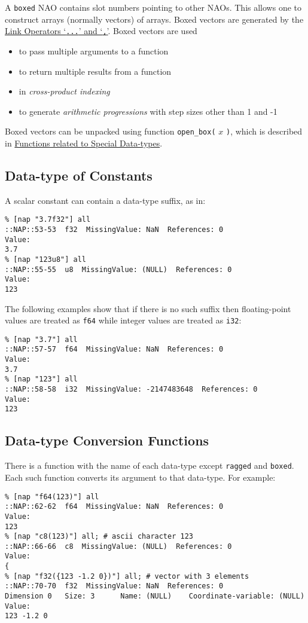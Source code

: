 A 
  \texttt{boxed} NAO contains slot numbers pointing to other NAOs.
  This allows one to construct arrays (normally vectors) of arrays.
  Boxed vectors are generated by the 
  \href{op.html\#Link}{Link Operators `\texttt{...}' and `\texttt{,}'}. Boxed vectors are used
  \begin{itemize}
    \item to pass multiple arguments to a function
    \item to return multiple results from a function
    \item in 
    \emph{cross-product indexing}
    \item to generate 
    \emph{arithmetic progressions} with step sizes other than 1 and
    -1
  \end{itemize}Boxed vectors can be unpacked using function 
  \texttt{open\_box(} 
  $x$ 
  \texttt{)}, which is described in 
  \href{function.html\#Special-Data-types}{Functions related to Special Data-types}.
  \subsection{
    \label{constant}Data-type of Constants
  }

  

A scalar constant can contain a data-type suffix, as in:
  \begin{verbatim}
% [nap "3.7f32"] all
::NAP::53-53  f32  MissingValue: NaN  References: 0
Value:
3.7
% [nap "123u8"] all
::NAP::55-55  u8  MissingValue: (NULL)  References: 0
Value:
123
\end{verbatim}

The following examples show that if there is no such suffix then
floating-point values are treated as 
  \texttt{f64} while integer values are treated as 
  \texttt{i32}:
  \begin{verbatim}
% [nap "3.7"] all
::NAP::57-57  f64  MissingValue: NaN  References: 0
Value:
3.7
% [nap "123"] all
::NAP::58-58  i32  MissingValue: -2147483648  References: 0
Value:
123
\end{verbatim}

  \subsection{
    \label{functions}Data-type Conversion Functions
  }
There is a function with the name of each data-type except 
  \texttt{ragged} and 
  \texttt{boxed}. Each such function converts its argument to that
  data-type. For example:
  \begin{verbatim}
% [nap "f64(123)"] all
::NAP::62-62  f64  MissingValue: NaN  References: 0
Value:
123
% [nap "c8(123)"] all; # ascii character 123
::NAP::66-66  c8  MissingValue: (NULL)  References: 0
Value:
{
% [nap "f32({123 -1.2 0})"] all; # vector with 3 elements
::NAP::70-70  f32  MissingValue: NaN  References: 0
Dimension 0   Size: 3      Name: (NULL)    Coordinate-variable: (NULL)
Value:
123 -1.2 0
\end{verbatim}

